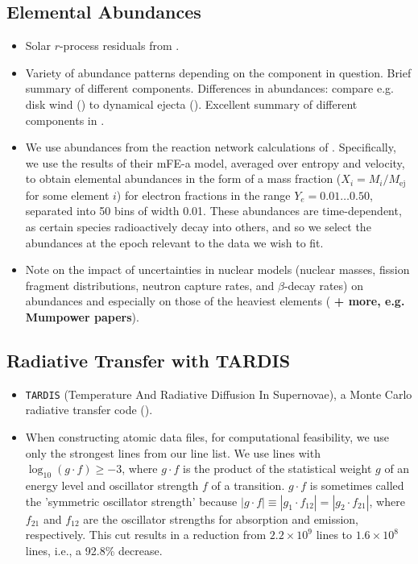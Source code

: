 \documentclass[twocolumn]{aastex63}
\begin{document}
\subsection{Elemental Abundances}
\begin{itemize}
    \item Solar $r$-process residuals from \cite{sneden08}.
    
    \item Variety of abundance patterns depending on the component in question. Brief summary of different components. Differences in abundances: compare e.g. disk wind (\citealt{wu16}) to dynamical ejecta (\citealt{wanajo14}). Excellent summary of different components in \cite{just15}. 
    
    \item We use abundances from the reaction network calculations of \cite{wanajo18}. Specifically, we use the results of their mFE-a model, averaged over entropy and velocity, to obtain elemental abundances in the form of a mass fraction ($X_{i} = M_{i} / M_{\mathrm{ej}}$ for some element $i$) for electron fractions in the range $Y_e = 0.01 \ldots 0.50$, separated into 50 bins of width 0.01. These abundances are time-dependent, as certain species radioactively decay into others, and so we select the abundances at the epoch relevant to the data we wish to fit. 
    
    \item Note on the impact of uncertainties in nuclear models (nuclear masses, fission fragment distributions, neutron capture rates, and $\beta$-decay rates) on abundances and especially on those of the heaviest elements (\citealt{eichler15, barnes16, cote18} \textbf{+ more, e.g. Mumpower papers}).
\end{itemize}

\subsection{Radiative Transfer with \textsc{TARDIS}}\label{ssc:TARDIS}
\begin{itemize}

    \item \texttt{TARDIS} (Temperature And Radiative Diffusion In Supernovae), a Monte Carlo radiative transfer code (\citealt{kerzendorf14}).
    
    \item When constructing atomic data files, for computational feasibility, we use only the strongest lines from our line list. We use lines with $\log_{10}(g \cdot f) \geqslant -3$, where $g \cdot f$ is the product of the statistical weight $g$ of an energy level and oscillator strength $f$ of a transition. $g \cdot f$ is sometimes called the 'symmetric oscillator strength' because $|g\cdot f| \equiv |g_1 \cdot f_{12}| = |g_2 \cdot f_{21}|$, where $f_{21}$ and $f_{12}$ are the oscillator strengths for absorption and emission, respectively. This cut results in a reduction from $2.2 \times 10^9$ lines to $1.6 \times 10^8$ lines, i.e., a 92.8\% decrease.
\end{itemize}
\end{document}
